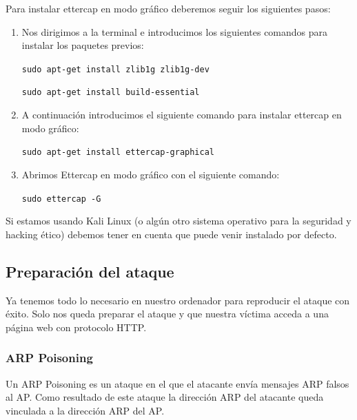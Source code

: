 Para instalar ettercap en modo gráfico deberemos seguir los siguientes pasos:
\begin{enumerate}
	\item Nos dirigimos a la terminal e introducimos los siguientes comandos para instalar los paquetes previos:
	\begin{center}
		\texttt{sudo apt-get install zlib1g zlib1g-dev}
		
		\texttt{sudo apt-get install build-essential}
		
	\end{center}
	\item A continuación introducimos el siguiente comando para instalar ettercap en modo gráfico:
	\begin{center}
		\texttt{sudo apt-get install ettercap-graphical}
		
	\end{center}
	\item Abrimos Ettercap en modo gráfico con el siguiente comando:
	\begin{center}
		\texttt{sudo ettercap -G}
		
	\end{center}
\end{enumerate}

\Nota Si estamos usando Kali Linux (o algún otro sistema operativo para la seguridad y hacking ético) debemos tener en cuenta que puede venir instalado por defecto.

\subsection{Preparación del ataque}
Ya tenemos todo lo necesario en nuestro ordenador para reproducir el ataque con éxito. Solo nos queda preparar el ataque y que nuestra víctima acceda a una página web con protocolo HTTP.

\subsubsection{ARP Poisoning}
Un ARP Poisoning es un ataque en el que el atacante envía mensajes ARP falsos al AP. Como resultado de este ataque la dirección ARP del atacante queda vinculada a la dirección ARP del AP.

